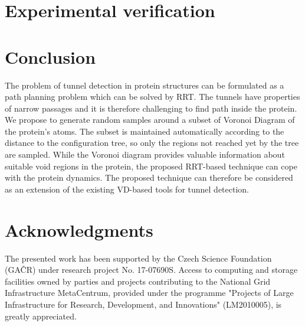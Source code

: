 \documentclass{llncs}
\begin{document}
\section{Experimental verification}



\section{Conclusion }

The problem of tunnel detection in protein structures can be formulated as a path planning problem which can be solved by RRT.
The tunnels have properties of narrow passages and it is therefore challenging to find path inside the protein.
We propose to generate random samples around a subset of Voronoi Diagram of the protein's atoms.
The subset is maintained automatically according to the distance to the configuration tree, so only the regions not reached yet
by the tree are sampled.
While the Voronoi diagram provides valuable information about suitable void regions in the protein, the
proposed RRT-based technique can cope with the protein dynamics.
The proposed technique can therefore be considered as an extension of the existing VD-based tools for tunnel detection.

\section{Acknowledgments}

The presented work has been supported by the Czech Science Foundation (GA{\v C}R) under research project No. 17-07690S.
Access to computing and storage facilities owned by parties and projects contributing to the National Grid Infrastructure MetaCentrum, provided under the programme "Projects of Large Infrastructure for Research, Development, and Innovations" (LM2010005), is greatly appreciated.




\end{document}

